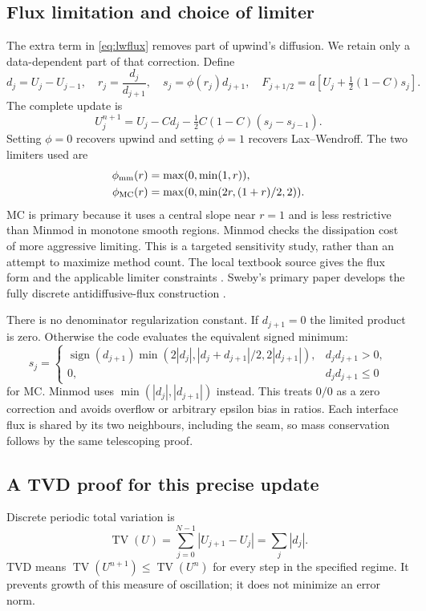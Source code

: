 \subsection{Flux limitation and choice of limiter}
The extra term in \eqref{eq:lwflux} removes part of upwind's diffusion. We retain only a data-dependent part of that correction. Define
\begin{equation}
 d_j=U_j-U_{j-1},\quad r_j=\frac{d_j}{d_{j+1}},\quad
 s_j=\phi(r_j)d_{j+1},\quad
 F_{j+1/2}=a\left[U_j+\tfrac12(1-C)s_j\right].
\end{equation}
The complete update is
\begin{equation}\label{eq:tvd}
 U_j^{n+1}=U_j-Cd_j-\tfrac12 C(1-C)(s_j-s_{j-1}).
\end{equation}
Setting $\phi=0$ recovers upwind and setting $\phi=1$ recovers Lax--Wendroff. The two limiters used are
\begin{align}
 \phi_{\rm mm}(r)&=\max(0,\min(1,r)),\\
 \phi_{\rm MC}(r)&=\max(0,\min(2r,(1+r)/2,2)).\label{eq:mc}
\end{align}
MC is primary because it uses a central slope near $r=1$ and is less restrictive than Minmod in monotone smooth regions. Minmod checks the dissipation cost of more aggressive limiting. This is a targeted sensitivity study, rather than an attempt to maximize method count. The local textbook source gives the flux form and the applicable limiter constraints \cite[Secs.~6.11--6.12]{leveque}. Sweby's primary paper develops the fully discrete antidiffusive-flux construction \cite{sweby}.

There is no denominator regularization constant. If $d_{j+1}=0$ the limited product is zero. Otherwise the code evaluates the equivalent signed minimum:
\begin{equation}\label{eq:slope}
 s_j=\begin{cases}
 \operatorname{sign}(d_{j+1})\min(2|d_j|,|d_j+d_{j+1}|/2,2|d_{j+1}|),&d_jd_{j+1}>0,\\
 0,&d_jd_{j+1}\le0
 \end{cases}
\end{equation}
for MC. Minmod uses $\min(|d_j|,|d_{j+1}|)$ instead. This treats $0/0$ as a zero correction and avoids overflow or arbitrary epsilon bias in ratios. Each interface flux is shared by its two neighbours, including the seam, so mass conservation follows by the same telescoping proof.

\subsection{A TVD proof for this precise update}
\label{sec:tvdproof}
Discrete periodic total variation is
\begin{equation}
 \operatorname{TV}(U)=\sum_{j=0}^{N-1}|U_{j+1}-U_j|=\sum_j|d_j|.
\end{equation}
TVD means $\operatorname{TV}(U^{n+1})\le\operatorname{TV}(U^n)$ for every step in the specified regime. It prevents growth of this measure of oscillation; it does not minimize an error norm.

